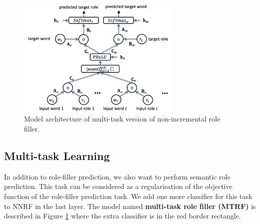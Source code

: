 \documentclass[a4paper]{article}
\begin{document}
\begin{figure}[t]
\centering
\includegraphics[width=0.7\textwidth]{MTRF.png}
\caption{\label{fig:MTNNRF} Model architecture of multi-task version of non-incremental role filler.}
\end{figure}


\subsection{Multi-task Learning} \label{sec:mtl}
In addition to role-filler prediction, we also want to perform semantic role prediction. This task can be considered as a regularisation of the objective function of the role-filler prediction task. We add one more classifier for this task to NNRF in the last layer. The model named \textbf{multi-task role filler (MTRF)} is described in Figure \ref{fig:MTNNRF} where the extra classifier is in the red border rectangle. 
\end{document}
